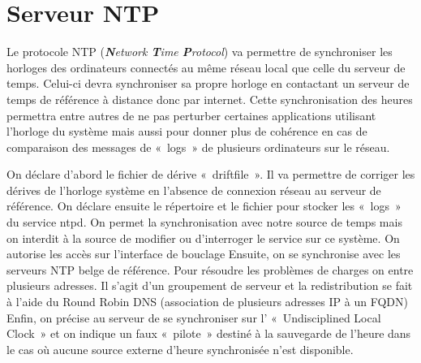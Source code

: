 \section{Serveur NTP}
Le protocole NTP (\textit{\textbf{N}etwork \textbf{T}ime \textbf{P}rotocol}) va permettre de synchroniser les horloges des ordinateurs connectés au même réseau local que celle du serveur de temps.
Celui-ci devra synchroniser sa propre horloge en contactant un serveur de temps de référence à distance donc par internet.
Cette synchronisation des heures permettra entre autres de ne pas perturber certaines applications utilisant l’horloge du système mais aussi pour donner plus de cohérence en cas de comparaison des messages de « logs » de plusieurs ordinateurs sur le réseau.




On déclare d’abord le fichier de dérive « driftfile ». Il va permettre de corriger les dérives de l’horloge système en l’absence de connexion réseau au serveur de référence.
On déclare ensuite le répertoire et le fichier pour stocker les « logs » du service ntpd. 
On permet la synchronisation avec notre source de temps mais on interdit à la source de modifier ou d’interroger le service sur ce système.
On autorise les accès sur l’interface de bouclage
Ensuite, on se synchronise avec les serveurs NTP belge de référence. Pour résoudre les problèmes de charges on entre plusieurs adresses. Il s’agit d’un groupement de serveur et la redistribution se fait à l’aide du Round Robin DNS (association de plusieurs adresses IP à un FQDN)
Enfin, on précise au serveur de se synchroniser sur l’ « Undisciplined Local Clock » et on indique un faux « pilote » destiné à la sauvegarde de l’heure dans le cas où aucune source externe d’heure synchronisée n’est disponible.

